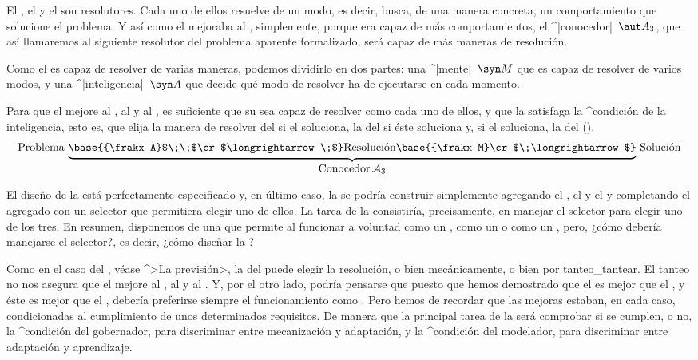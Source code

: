 El {\mecanismo}, el {\adaptador} y el {\aprendiz} son resolutores. Cada
uno de ellos resuelve de un modo, es decir, busca, de una manera
concreta, un comportamiento que solucione el problema. Y así como el
{\adaptador} mejoraba al {\mecanismo}, simplemente, porque era capaz de
más comportamientos, el ^|conocedor|~$\aut A_3$, que así llamaremos al
siguiente resolutor del problema aparente formalizado, será capaz de más
maneras de resolución.

Como el {\conocedor} es capaz de resolver de varias maneras, podemos
dividirlo en dos partes:
\point una ^|mente|~$\syn M$ que es capaz de resolver de varios modos, y
\point una ^|inteligencia|~$\syn A$ que decide qué modo de resolver ha de
ejecutarse en cada momento.

\noindent Para que el {\conocedor} mejore al {\mecanismo},
al {\adaptador} y al {\aprendiz}, es suficiente que su {\mente} sea
capaz de resolver como cada uno de ellos, y que la {\inteligencia}
satisfaga la ^{condición de la inteligencia}, esto es, que elija la
manera de resolver del {\mecanismo} si el {\mecanismo} soluciona, la del
{\adaptador} si éste soluciona y, si el {\aprendiz} soluciona, la del
{\aprendiz} ().
$$\hbox{Problema}\,
   \underbrace{\strut
    \base{{\frakx A}$\;\;$\cr $\longrightarrow\;$}
  \hbox{Resolución}
    \base{{\frakx M}\cr $\;\longrightarrow$}}_{\hbox{%
     Conocedor$\,{\cal A}_3$}}
  \,\hbox{Solución}
$$

El diseño de la {\mente} está perfectamente especificado y, en último
caso, la {\mente} se podría construir simplemente agregando el
{\mecanismo}, el {\adaptador} y el {\aprendiz} y completando el agregado
con un selector que permitiera elegir uno de ellos. La tarea de la
{\inteligencia} consistiría, precisamente, en manejar el selector para
elegir uno de los tres. En resumen, disponemos de una {\mente} que
permite al {\conocedor} funcionar a voluntad como un {\mecanismo}, como
un {\adaptador} o como un {\aprendiz}, pero, ¿cómo debería manejarse el
selector?, es decir, ¿cómo diseñar la {\inteligencia}?

Como en el caso del {\gobernador}, véase ^>La previsión>, la
{\inteligencia} del {\conocedor} puede elegir la resolución, o bien
mecánicamente, o bien por tanteo_{tantear}. El tanteo no nos asegura que
el {\conocedor} mejore al {\mecanismo}, al {\adaptador} y al
{\aprendiz}. Y, por el otro lado, podría pensarse que puesto que hemos
demostrado que el {\aprendiz} es mejor que el {\adaptador}, y éste es
mejor que el {\mecanismo}, debería preferirse siempre el funcionamiento
como {\aprendiz}. Pero hemos de recordar que las mejoras estaban, en
cada caso, condicionadas al cumplimiento de unos determinados
requisitos. De manera que la principal tarea de la {\inteligencia} será
comprobar si se cumplen, o no, la ^{condición del gobernador}, para
discriminar entre mecanización y adaptación, y la ^{condición del
modelador}, para discriminar entre adaptación y aprendizaje.


